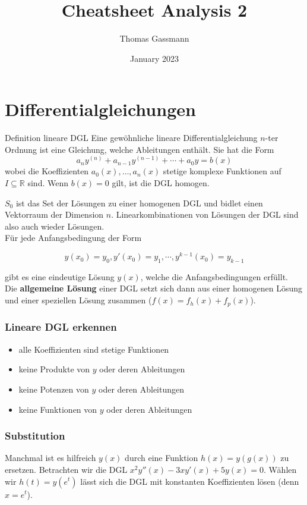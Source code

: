 \documentclass[a4paper,10pt]{article}
\title{Cheatsheet Analysis 2}
\author{Thomas Gassmann}
\date{January 2023}
\def\R{\mathbb{R}}
\begin{document}


\section{Differentialgleichungen}
\begin{mainbox}{Definition lineare DGL}
  Eine gewöhnliche lineare Differentialgleichung $n$-ter Ordnung ist eine Gleichung, welche Ableitungen enthält. Sie hat die Form \[a_n y^{(n)} + a_{n-1} y^{(n-1)} + \cdots + a_0y = b(x)\]
  wobei die Koeffizienten \(a_0(x), \ldots, a_{n}(x)\) stetige komplexe Funktionen auf \(I \subseteq \R\) sind. Wenn \(b(x) = 0\) gilt, ist die DGL homogen.
\end{mainbox}

\(S_0\) ist das Set der Lösungen zu einer homogenen DGL und bidlet einen Vektorraum der Dimension $n$. Linearkombinationen von Lösungen der DGL sind also auch wieder Lösungen.\\

Für jede Anfangsbedingung der Form

$$y(x_0) = y_0, y'(x_0) = y_1, \cdots, y^{k-1}(x_0) = y_{k-1}$$

gibt es eine eindeutige Lösung $y(x)$, welche die Anfangsbedingungen erfüllt.\\

Die \textbf{allgemeine Lösung} einer DGL setzt sich dann aus einer homogenen Lösung und einer speziellen Lösung zusammen ($f(x) = f_h(x) + f_p(x)$).

\subsubsection*{Lineare DGL erkennen}
\begin{itemize}
  \item alle Koeffizienten sind stetige Funktionen
  \item keine Produkte von $y$ oder deren Ableitungen
  \item keine Potenzen von $y$ oder deren Ableitungen
  \item keine Funktionen von $y$ oder deren Ableitungen
\end{itemize}

\subsubsection*{Substitution}

Manchmal ist es hilfreich $y(x)$ durch eine Funktion $h(x) = y(g(x))$ zu ersetzen. Betrachten wir die DGL $x^2 y''(x) - 3xy'(x) + 5y(x) = 0$. Wählen wir $h(t) = y(e^t)$ lässt sich die DGL mit konstanten Koeffizienten lösen (denn $x = e^t$).
\end{document}
